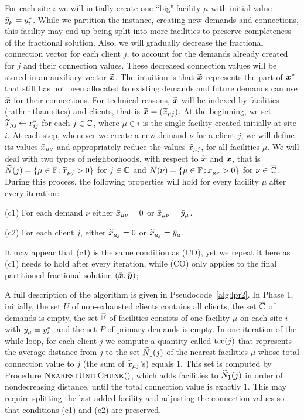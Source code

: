 \documentclass{llncs}
\begin{document}
For each site $i$ we will initially create one ``big" facility $\mu$
with initial value ${\bar y}_\mu = y^\ast_i$.  While we partition the
instance, creating new demands and connections, this facility may end
up being split into more facilities to preserve completeness of the
fractional solution. Also, we will gradually decrease the fractional
connection vector for each client $j$, to account for the demands
already created for $j$ and their connection values.  These decreased
connection values will be stored in an auxiliary vector
$\widetilde{\boldsymbol{x}}$. The intuition is that $\widetilde{\boldsymbol{x}}$ represents the part of
$\boldsymbol{x}^\ast$ that still has not been allocated to existing demands and
future demands can use $\widetilde{\boldsymbol{x}}$ for their connections. For
technical reasons, $\widetilde{\boldsymbol{x}}$ will be indexed by facilities (rather
than sites) and clients, that is $\widetilde{\boldsymbol{x}} = ({\widetilde x}_{\mu j})$.  At
the beginning, we set ${\widetilde x}_{\mu j}{\,\leftarrow\,} x_{ij}^\ast$ for each
$j\in\mathbb{C}$, where $\mu\in i$ is the single facility created
initially at site $i$.  At each step, whenever we create a new demand
$\nu$ for a client $j$, we will define its values ${\bar x}_{\mu\nu}$ and
appropriately reduce the values ${\widetilde x}_{\mu j}$, for all facilities
$\mu$. We will deal with two types of neighborhoods, with respect to
$\widetilde{\boldsymbol{x}}$ and $\bar{\boldsymbol{x}}$, that is ${\widetilde N}(j)=\{\mu\in\overline{\mathbb{F}}
{\,:\,}{\widetilde x}_{\mu j} > 0\}$ for $j\in\mathbb{C}$ and
${\overline{N}}(\nu)=\{\mu\in\overline{\mathbb{F}} {\,:\,} {\bar x}_{\mu\nu} >0\}$ for
$\nu\in\overline{\mathbb{C}}$.  During this process, the following properties
will hold for every facility $\mu$ after every iteration: 
\begin{description}
\item (c1) For each demand $\nu$ either ${\bar x}_{\mu\nu}=0$ or
  ${\bar x}_{\mu\nu}={\bar y}_{\mu}$.
\item (c2) For each client $j$, either ${\widetilde x}_{\mu j}=0$ or
  ${\widetilde x}_{\mu j}={\bar y}_{\mu}$.
\end{description}
It may appear that (c1) is the same condition as (CO), yet we repeat
it here as (c1) needs to hold after every iteration, while (CO) only
applies to the final partitioned fractional solution $(\bar{\boldsymbol{x}},
\bar{\boldsymbol{y}})$;

A full description of the algorithm is given in
Pseudocode~\ref{alg:lpr2}. In Phase 1, initially, the set $U$ of
non-exhausted clients contains all clients, the set $\overline{\mathbb{C}}$ of
demands is empty, the set $\overline{\mathbb{F}}$ of facilities consists of one
facility $\mu$ on each site $i$ with ${\bar y}_\mu = y^\ast_i$, and the
set $P$ of primary demands is empty.  In one iteration of the while
loop, for each client $j$ we compute a quantity called $\textrm{tcc}(j)$
that represents the average distance from
$j$ to the set ${\widetilde N}_1(j)$ of the nearest facilities $\mu$ whose
total connection value to $j$ (the sum of ${\widetilde x}_{\mu j}$'s) equals
$1$.  This set is computed by Procedure ${\textsc{NearestUnitChunk}}()$, which
adds facilities to ${\widetilde N}_1(j)$ in order of nondecreasing distance,
until the total connection value is exactly $1$. This may require
splitting the last added facility and adjusting the connection values
so that conditions (c1) and (c2) are preserved.
\end{document}
